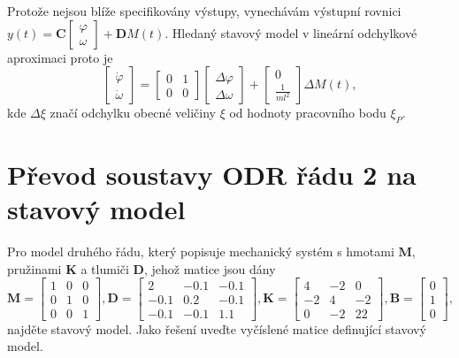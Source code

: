 \documentclass[twoside]{article}
\begin{document}
Protože nejsou blíže specifikovány výstupy, vynechávám výstupní rovnici $y(t) = \mathbf{C}\begin{bmatrix}
	\varphi \\ 
	\omega
\end{bmatrix} + \mathbf{D} M(t)$. Hledaný stavový model v lineární odchylkové aproximaci proto je
\begin{equation}
	\begin{bmatrix}
		\dot{\varphi} \\ 
		\dot{\omega}
	\end{bmatrix} = \begin{bmatrix}
		0 & 1 \\ 0 & 0
	\end{bmatrix} \begin{bmatrix}
		\Delta \varphi \\ \Delta \omega
	\end{bmatrix} + \begin{bmatrix}
		0 \\ \frac{1}{ml^2}
	\end{bmatrix} \Delta M(t),
\end{equation}
kde $\Delta \xi$ značí odchylku obecné veličiny $\xi$ od hodnoty pracovního bodu $\xi_P$.

\section{Převod soustavy ODR řádu 2 na stavový model}

Pro model druhého řádu, který popisuje mechanický systém s hmotami $\mathbf{M}$, pružinami $\mathbf{K}$ a tlumiči $\mathbf{D}$, jehož matice jsou dány
\begin{equation}
	\mathbf{M} = \begin{bmatrix}
		1 & 0 &0 \\
		0 & 1 &0 \\
		0 & 0 &1 
	\end{bmatrix}, \mathbf{D} = \begin{bmatrix}
		   2 & -0.1 &  -0.1 \\
		-0.1 & 0.2  & -0.1 \\
		-0.1 & -0.1 &  1.1 
	\end{bmatrix}, \mathbf{K} = \begin{bmatrix}
		
		 4 & -2 &  0 \\
		-2 & 4  & -2 \\
		 0 & -2 &  22 
	\end{bmatrix}, \mathbf{B} = \begin{bmatrix}
		0 \\ 1 \\ 0
	\end{bmatrix},
\end{equation}
najděte stavový model. Jako řešení uveďte vyčíslené matice definující stavový model.
\end{document}
